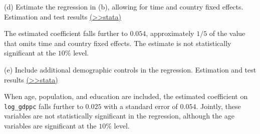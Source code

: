 \documentclass[
  10pt,
  ignorenonframetext,
]{beamer}
\begin{document}
\begin{frame}{(d) Estimate the regression in (b), allowing for time and
country fixed effects.}
\protect\hypertarget{Ex2-BothFEs-A}{}
Estimation and test results
\footnotesize \protect\hyperlink{Ex2-BothFEs}{(\textgreater\textgreater stata)}
\normalsize

The estimated coefficient falls further to \(0.054\), approximately
\(1/5\) of the value that omits time and country fixed effects. The
estimate is not statistically significant at the \(10\%\) level.
\end{frame}

\begin{frame}[fragile]{(e) Include additional demographic controls in
the regression.}
\protect\hypertarget{Ex2-BothFEswithcontrols-A}{}
Estimation and test results
\footnotesize \protect\hyperlink{Ex2-BothFEswithcontrols}{(\textgreater\textgreater stata)}
\normalsize

When age, population, and education are included, the estimated
coefficient on \texttt{log\_gdppc} falls further to \(0.025\) with a
standard error of \(0.054\). Jointly, these variables are not
statistically significant in the regression, although the age variables
are significant at the \(10\%\) level.
\end{frame}
\end{document}
